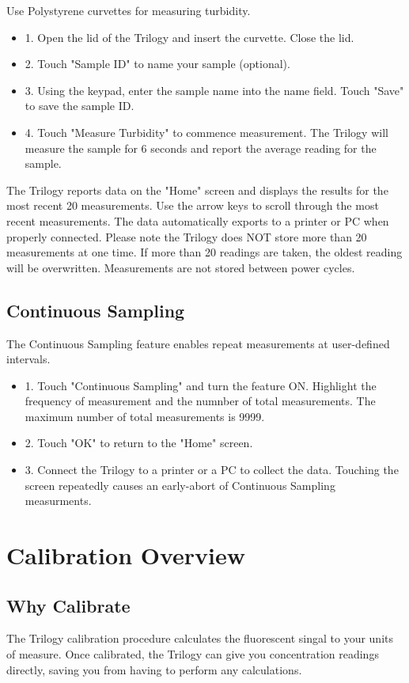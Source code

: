 \documentclass[12pt]{../SOP3_beta}
\begin{document}
\NP Use Polystyrene curvettes for measuring turbidity.
\begin{itemize}
  \item 1. Open the lid of the Trilogy and insert the curvette. Close the lid.
  \item 2. Touch "Sample ID" to name your sample (optional).
  \item 3. Using the keypad, enter the sample name into the name field. Touch "Save" to save the sample ID.
  \item 4. Touch "Measure Turbidity" to commence measurement. The Trilogy will measure the sample for 6 seconds and report the average reading for the sample. 
\end{itemize}

\NP The Trilogy reports data on the "Home" screen and displays the results for the most recent 20 measurements. Use the arrow keys to scroll through the most recent measurements. The data automatically exports to a printer or PC when properly connected. Please note the Trilogy does NOT store more than 20 measurements at one time. If more than 20 readings are taken, the oldest reading will be overwritten. Measurements are not stored between power cycles.

\subsection{Continuous Sampling}
\NP The Continuous Sampling feature enables repeat measurements at user-defined intervals.
\begin{itemize}
  \item 1. Touch "Continuous Sampling" and turn the feature ON. Highlight the frequency of measurement and the numnber of total measurements. The maximum number of total measurements is 9999.
  \item 2. Touch "OK" to return to the "Home" screen.
  \item 3. Connect the Trilogy to a printer or a PC to collect the data. Touching the screen repeatedly causes an early-abort of Continuous Sampling measurments. 
\end{itemize}

\section{Calibration Overview}
\subsection{Why Calibrate}
\NP The Trilogy calibration procedure calculates the fluorescent singal to your units of measure. Once calibrated, the Trilogy can give you concentration readings directly, saving you from having to perform any calculations. 
\end{document}
